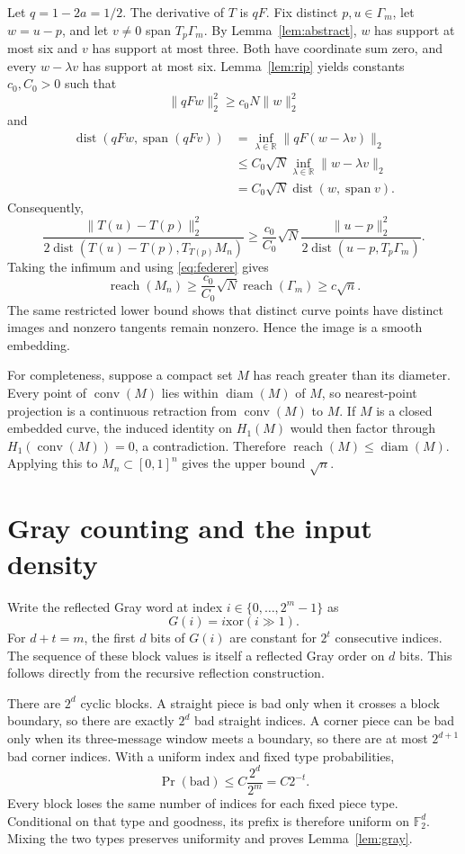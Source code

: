 \documentclass{article}
\theoremstyle{definition}
\theoremstyle{remark}
\newcommand{\Ftwo}{\mathbb F_2}
\newcommand{\R}{\mathbb R}
\newcommand{\1}{\mathbf 1}
\newcommand{\reach}{\operatorname{reach}}
\newcommand{\dist}{\operatorname{dist}}
\begin{document}
Let $q=1-2a=1/2$. The derivative of $T$ is $qF$. Fix distinct $p,u\in\Gamma_m$, let $w=u-p$, and let $v\ne0$ span $T_p\Gamma_m$. By Lemma~\ref{lem:abstract}, $w$ has support at most six and $v$ has support at most three. Both have coordinate sum zero, and every $w-\lambda v$ has support at most six. Lemma~\ref{lem:rip} yields constants $c_0,C_0>0$ such that \[ \|qFw\|_2^2\geq c_0N\|w\|_2^2 \] and
\begin{align*}
\dist(qFw,\operatorname{span}(qFv))
&=\inf_{\lambda\in\R}\|qF(w-\lambda v)\|_2\\
&\leq C_0\sqrt N\inf_{\lambda\in\R}\|w-\lambda v\|_2\\
&=C_0\sqrt N\dist(w,\operatorname{span}v).
\end{align*}
Consequently, \[ \frac{\|T(u)-T(p)\|_2^2} {2\dist(T(u)-T(p),T_{T(p)}M_n)} \geq \frac{c_0}{C_0}\sqrt N \frac{\|u-p\|_2^2}{2\dist(u-p,T_p\Gamma_m)}. \] Taking the infimum and using \eqref{eq:federer} gives \[ \reach(M_n)\geq\frac{c_0}{C_0}\sqrt N\reach(\Gamma_m) \geq c\sqrt n. \] The same restricted lower bound shows that distinct curve points have distinct images and nonzero tangents remain nonzero. Hence the image is a smooth embedding.

For completeness, suppose a compact set $M$ has reach greater than its diameter. Every point of $\operatorname{conv}(M)$ lies within $\operatorname{diam}(M)$ of $M$, so nearest-point projection is a continuous retraction from $\operatorname{conv}(M)$ to $M$. If $M$ is a closed embedded curve, the induced identity on $H_1(M)$ would then factor through $H_1(\operatorname{conv}(M))=0$, a contradiction. Therefore $\reach(M)\leq\operatorname{diam}(M)$. Applying this to $M_n\subset[0,1]^n$ gives the upper bound $\sqrt n$.

\section{Gray counting and the input density}
\label{app:gray}

Write the reflected Gray word at index $i\in\{0,\ldots,2^m-1\}$ as \[ G(i)=i\mathbin{\mathrm{xor}}(i\!\gg\!1). \] For $d+t=m$, the first $d$ bits of $G(i)$ are constant for $2^t$ consecutive indices. The sequence of these block values is itself a reflected Gray order on $d$ bits. This follows directly from the recursive reflection construction.

There are $2^d$ cyclic blocks. A straight piece is bad only when it crosses a block boundary, so there are exactly $2^d$ bad straight indices. A corner piece can be bad only when its three-message window meets a boundary, so there are at most $2^{d+1}$ bad corner indices. With a uniform index and fixed type probabilities, \[ \Pr(\text{bad})\leq C\frac{2^d}{2^m}=C2^{-t}. \] Every block loses the same number of indices for each fixed piece type. Conditional on that type and goodness, its prefix is therefore uniform on $\Ftwo^d$. Mixing the two types preserves uniformity and proves Lemma~\ref{lem:gray}.
\end{document}
